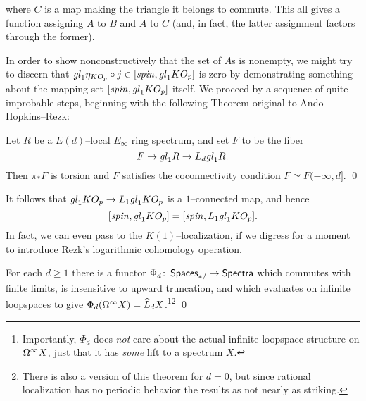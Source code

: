 \begin{center}
\end{center}
where $C$ is a map making the triangle it belongs to commute.  This all gives a function assigning $A$ to $B$ and $A$ to $C$ (and, in fact, the latter assignment factors through the former).

In order to show nonconstructively that the set of $A$s is nonempty, we might try to discern that $\mathit{gl}_1 \eta_{KO_p} \circ j \in [\mathit{spin}, \mathit{gl}_1 KO_p]$ is zero by demonstrating something about the mapping set $[\mathit{spin}, \mathit{gl}_1 KO_p]$ itself.  We proceed by a sequence of quite improbable steps, beginning with the following Theorem original to Ando--Hopkins--Rezk:
\begin{theorem}
Let $R$ be a $E(d)$--local $E_\infty$ ring spectrum, and set $F$ to be the fiber \[F \to \mathit{gl}_1 R \to L_d \mathit{gl}_1 R.\]  Then $\pi_* F$ is torsion and $F$ satisfies the coconnectivity condition $F \simeq F(-\infty, d]$. \qed
\end{theorem}

\noindent It follows that $\mathit{gl}_1 KO_p \to L_1 \mathit{gl}_1 KO_p$ is a $1$--connected map, and hence \[[\mathit{spin}, \mathit{gl}_1 KO_p] = [\mathit{spin}, L_1 \mathit{gl}_1 KO_p].\]  In fact, we can even pass to the $K(1)$--localization, if we digress for a moment to introduce Rezk's logarithmic cohomology operation.

\begin{lemma}
For each $d \ge 1$ there is a functor $\Phi_d\colon\thinspace \mathsf{Spaces}_{*/} \to \mathsf{Spectra}$ which commutes with finite limits, is insensitive to upward truncation, and which evaluates on infinite loopspaces to give $\Phi_d(\Omega^\infty X) = \widehat L_d X$.\footnote{Importantly, $\Phi_d$ does \emph{not} care about the actual infinite loopspace structure on $\Omega^\infty X$, just that it has \emph{some} lift to a spectrum $X$.}\footnote{There is also a version of this theorem for $d = 0$, but since rational localization has no periodic behavior the results as not nearly as striking.} \qed
\end{lemma}

